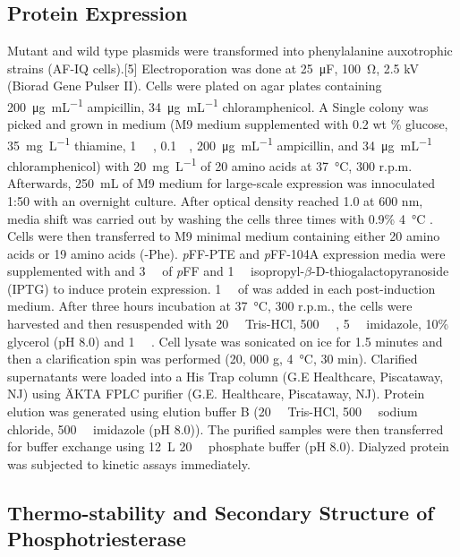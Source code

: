 \begin{refsection}
\subsection{Protein Expression}
Mutant and wild type plasmids were transformed into  phenylalanine
auxotrophic strains (AF-IQ cells).[5] Electroporation was done at
\SI{25}{\micro\farad}, \SI{100}{\ohm}, 2.5 kV (Biorad Gene Pulser II). Cells were
plated on agar plates containing \SI{200}{\ug\per\mL} ampicillin, \SI{34}{\ug\per\mL}
chloramphenicol. A Single colony was picked and grown in medium (M9 medium
supplemented with 0.2 wt \% glucose, \SI{35}{\mg\per\L} thiamine, \SI{1}{\milli\Molar}
, \SI{0.1}{\milli\Molar}, \SI{200}{\ug\per\mL} ampicillin, and
\SI{34}{\ug\per\mL} chloramphenicol) with \SI{20}{\mg\per\L} of 20 amino acids
at \SI{37}{\celsius}, 300 r.p.m.  Afterwards, \SI{250}{\mL} of M9 medium for
large-scale expression was innoculated 1:50 with an overnight culture.  After
optical density reached 1.0 at 600 nm, media shift was carried out by washing
the cells three times with 0.9\% \SI{4}{\celsius} .  Cells were then
transferred to M9 minimal medium containing either 20 amino acids or 19 amino
acids (-Phe). \emph{p}FF-PTE and \emph{p}FF-104A expression media were
supplemented with and \SI{3}{\milli\Molar} of \emph{p}FF and
\SI{1}{\milli\Molar} isopropyl-$\beta$-D-thiogalactopyranoside (IPTG) to induce
protein expression.  \SI{1}{\milli\Molar} of  was added in each
post-induction medium. After three hours incubation at \SI{37}{\celsius}, 300
r.p.m., the cells were harvested and then resuspended with
\SI{20}{\milli\Molar} Tris-HCl, \SI{500}{\milli\Molar} ,
\SI{5}{\milli\Molar} imidazole, 10\% glycerol (pH 8.0) and \SI{1}{\micro\Molar}
. Cell lysate was sonicated on ice for 1.5 minutes and then a
clarification spin was performed (20, 000 g, \SI{4}{\celsius}, 30 min).
Clarified supernatants were loaded into a His Trap column (G.E Healthcare,
Piscataway, NJ) using ÄKTA FPLC purifier (G.E.  Healthcare, Piscataway, NJ).
Protein elution was generated using elution buffer B (\SI{20}{\milli\Molar}
Tris-HCl, \SI{500}{\milli\Molar} sodium chloride, \SI{500}{\milli\Molar}
imidazole (pH 8.0)).  The purified samples were then transferred for buffer
exchange using \SI{12}{\L} \SI{20}{\milli\Molar} phosphate buffer (pH 8.0).
Dialyzed protein was subjected to kinetic assays immediately.

\subsection{Thermo-stability and Secondary Structure of Phosphotriesterase}
\label{sec:thermo}


\end{refsection}
